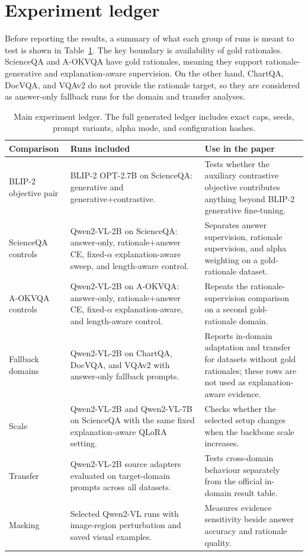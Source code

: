 \documentclass[12pt,bibliography=totoc,listof=totoc,BCOR=5mm,DIV=12,oneside,open=any]{scrbook}
\begin{document}
\section{Experiment ledger}
Before reporting the results, a summary of what each group of runs is meant to test is shown in Table~\ref{tab:ExperimentLedger}.
The key boundary is availability of gold rationales.
ScienceQA and A-OKVQA have gold rationales, meaning they support rationale-generative and explanation-aware supervision.
On the other hand, ChartQA, DocVQA, and VQAv2 do not provide the rationale target, so they are considered as answer-only fallback runs for the domain and transfer analyses.

\begin{table}[!ht]
\centering
\caption{Main experiment ledger. The full generated ledger includes exact caps, seeds, prompt variants, alpha mode, and configuration hashes.}
\label{tab:ExperimentLedger}
\small
\renewcommand{\arraystretch}{1.15}
\begin{tabular}{|>{\raggedright\arraybackslash}p{}|>{\raggedright\arraybackslash}p{}|>{\raggedright\arraybackslash}p{}|}
\hline
\textbf{Comparison} & \textbf{Runs included} & \textbf{Use in the paper} \\ \hline
BLIP-2 objective pair & BLIP-2 OPT-2.7B on ScienceQA: generative and generative+contrastive. & Tests whether the auxiliary contrastive objective contributes anything beyond BLIP-2 generative fine-tuning. \\
ScienceQA controls & Qwen2-VL-2B on ScienceQA: answer-only, rationale+answer CE, fixed-$\alpha$ explanation-aware sweep, and length-aware control. & Separates answer supervision, rationale supervision, and alpha weighting on a gold-rationale dataset. \\
A-OKVQA controls & Qwen2-VL-2B on A-OKVQA: answer-only, rationale+answer CE, fixed-$\alpha$ explanation-aware, and length-aware control. & Repeats the rationale-supervision comparison on a second gold-rationale domain. \\
Fallback domains & Qwen2-VL-2B on ChartQA, DocVQA, and VQAv2 with answer-only fallback prompts. & Reports in-domain adaptation and transfer for datasets without gold rationales; these rows are not used as explanation-aware evidence. \\
Scale & Qwen2-VL-2B and Qwen2-VL-7B on ScienceQA with the same fixed explanation-aware QLoRA setting. & Checks whether the selected setup changes when the backbone scale increases. \\
Transfer & Qwen2-VL-2B source adapters evaluated on target-domain prompts across all datasets. & Tests cross-domain behaviour separately from the official in-domain result table. \\
Masking & Selected Qwen2-VL runs with image-region perturbation and saved visual examples. & Measures evidence sensitivity beside answer accuracy and rationale quality. \\ \hline
\end{tabular}
\end{table}
\end{document}
